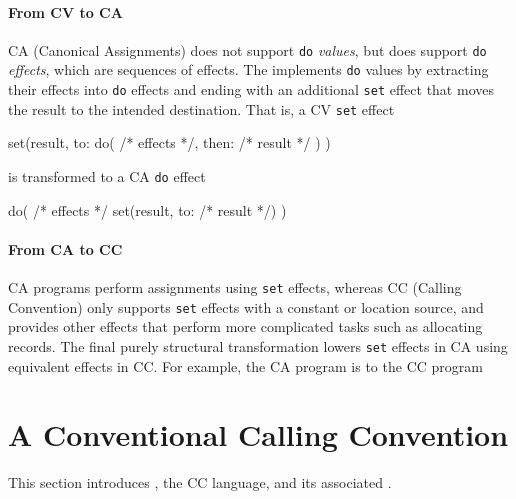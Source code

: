 \documentclass[main.tex]{subfiles}
\begin{document}
\paragraph{From CV to CA} CA (Canonical Assignments) does not support \texttt{do} \emph{values}, but does support \texttt{do} \emph{effects}, which are sequences of effects. The  implements \texttt{do} values by extracting their effects into \texttt{do} effects and ending with an additional \texttt{set} effect that moves the result to the intended destination. That is, a CV \texttt{set} effect
\begin{il}
	set(result, to:
		do(
			/* effects */,
			then: /* result */
		)
	)
\end{il}
is transformed to a CA \texttt{do} effect
\begin{il}
	do(
		/* effects */
		set(result, to: /* result */)
	)
\end{il}

\paragraph{From CA to CC} CA programs perform assignments using \texttt{set} effects, whereas CC (Calling Convention) only supports \texttt{set} effects with a constant or location source, and provides other effects that perform more complicated tasks such as allocating records. The final purely structural transformation lowers \texttt{set} effects in CA using equivalent effects in CC. For example, the CA program
is \lowered{} to the CC program

\section{A Conventional Calling Convention} \label{sct:cc}

This section introduces , the CC language, and its associated .
\end{document}
